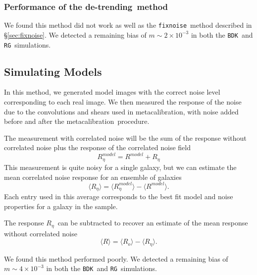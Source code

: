 \documentclass[a4paper,fleqn,usenatbib]{mnras}
\newcommand{\mcal}{metacalibration}
\newcommand{\mcalR}{$R$}
\newcommand{\mcalRo}{$R_o$}
\newcommand{\mcalRnoise}{$R_\eta$}
\newcommand{\mcalRmodel}{$R^{model}$}
\newcommand{\mcalRnoisemodel}{$R^{model}_\eta$}
\newcommand{\detrend}{de-trending}
\newcommand{\fixnoise}{\texttt{fixnoise}}
\newcommand{\bdsim}{\texttt{BDK}}
\newcommand{\rgsim}{\texttt{RG}}
\begin{document}
\subsubsection{Performance of the \detrend\ method}

We found this method did not work as well as the \fixnoise\ method
described in \S \ref{sec:fixnoise}.  We detected a remaining bias
of $m \sim 2 \times 10^{-3}$ in both the \bdsim\ and \rgsim\ simulations.

\subsection{Simulating Models}

In this method, we generated model images with the correct noise level corresponding
to each real image.  We then measured the response of the noise due to the
convolutions and shears used in \mcal, with noise added before and
after the \mcal\ procedure.

The measurement with correlated noise will be the sum of the response
without correlated noise plus the response of the correlated noise field
\begin{equation}
    \mbox{\mcalRnoisemodel} = \mbox{\mcalRmodel} + \mbox{\mcalRnoise}
\end{equation}
This measurement is quite noisy for a single galaxy, but we
can estimate the mean correlated noise response for an ensemble
of galaxies
\begin{equation}
    \langle \mbox{\mcalRnoise} \rangle = \langle \mbox{\mcalRnoisemodel} \rangle - \langle \mbox{\mcalRmodel} \rangle.
\end{equation}
Each entry used in this average corresponds to the best fit model
and noise properties for a galaxy in the sample.

The response \mcalRnoise\ can be subtracted to recover an estimate of the mean
response without correlated noise
\begin{equation}
    \langle \mbox{\mcalR} \rangle = \langle \mbox{\mcalRo} \rangle - \langle \mbox{\mcalRnoise} \rangle.
\end{equation}

We found this method performed poorly.  We detected a remaining bias of  $m
\sim 4 \times 10^{-3}$ in both the \bdsim\ and \rgsim\ simulations.




\end{document}
